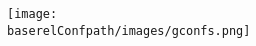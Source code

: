 \documentclass{beamer}
\begin{document}
\title{\workshoptitle}
\author{Name \textit{Nickname} \textsc{Surname} \and \textsc{GConfs}}
\date{Day xx Month 201x}

\begin{frame}
  \begin{center}
    \texttt{[image: \\baserelConfpath/images/gconfs.png]}
  \end{center}

  \maketitle
\end{frame}

\begin{frame}
  \tableofcontents
\end{frame}
\end{document}
